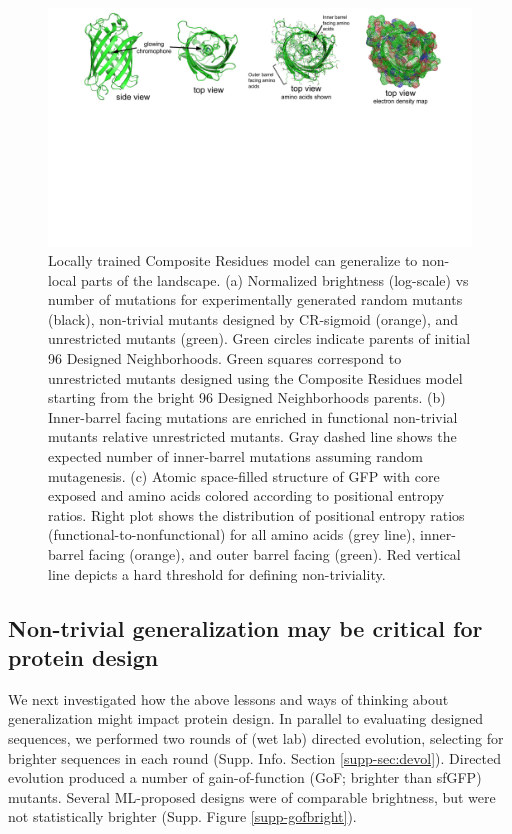 \begin{figure}
  \includegraphics[width=1\linewidth,page=4,trim={0cm 5cm 0cm 0}]{figures/2018-05-09-NIPS_2018_Figures.pdf}
  \caption{\small{Locally trained Composite Residues model can generalize to non-local parts of the landscape.
    (a) Normalized brightness (log-scale) vs number of mutations for experimentally generated random mutants (black), non-trivial mutants designed by CR-sigmoid (orange), and unrestricted mutants (green). Green circles indicate parents of initial 96 Designed Neighborhoods. Green squares correspond to unrestricted mutants designed using the Composite Residues model starting from the bright 96 Designed Neighborhoods parents. (b)  Inner-barrel facing mutations are enriched in functional non-trivial mutants relative unrestricted mutants.  Gray dashed line shows the expected number of inner-barrel mutations assuming random mutagenesis. (c) Atomic space-filled structure of GFP with core exposed and amino acids colored according to positional entropy ratios. Right plot shows the distribution of positional entropy ratios (functional-to-nonfunctional) for all amino acids (grey line), inner-barrel facing (orange), and outer barrel facing (green). Red vertical line depicts a hard threshold for defining non-triviality.}}
  \label{fig-generalization}
  \vspace{-0.6cm}
\end{figure}

\subsection{Non-trivial generalization may be critical for protein design}

We next investigated how the above lessons and ways of thinking about generalization might impact protein design. In parallel to evaluating designed sequences, we performed two rounds of (wet lab) directed evolution, selecting for brighter sequences in each round (Supp. Info. Section \ref{supp-sec:devol}). Directed evolution produced a number of gain-of-function (GoF; brighter than sfGFP) mutants. Several ML-proposed designs were of comparable brightness, but were not statistically brighter (Supp. Figure \ref{supp-gofbright}).

